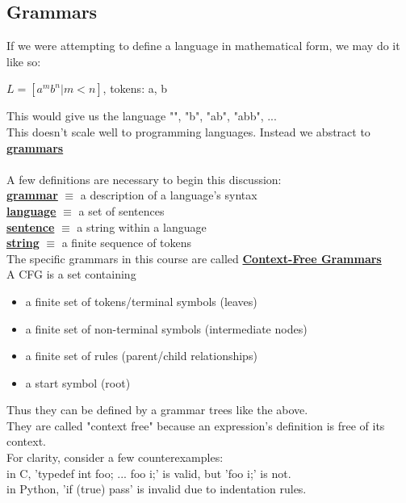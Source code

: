 \documentclass[../../lecture_notes.tex]{subfiles}
\begin{document}
\subsection*{Grammars}
\noindent If we were attempting to define a language in mathematical form, we may do it like so:
	\begin{center} $L = [a^m b^n | m < n]$, tokens: {a, b} \end{center}
This would give us the language {"", "b", "ab", "abb", ...}\\
This doesn't scale well to programming languages.  Instead we abstract to \textbf{\underline{grammars}}\\
\\
A few definitions are necessary to begin this discussion:\\
\indent \textbf{\underline{grammar}} $\equiv$ a description of a language's syntax\\
\indent \indent  \textbf{\underline{language}} $\equiv$ a set of sentences\\
\indent \indent  \textbf{\underline{sentence}} $\equiv$ a string within a language\\
\indent \indent  \textbf{\underline{string}} $\equiv$ a finite sequence of tokens\\
The specific grammars in this course are called \textbf{\underline{Context-Free Grammars}}\\
A CFG is a set containing \begin{itemize} [itemsep=0mm]
	\item a finite set of tokens/terminal symbols (leaves)
	\item a finite set of non-terminal symbols (intermediate nodes)
	\item a finite set of rules (parent/child relationships)
	\item a start symbol (root)
\end{itemize}
Thus they can be defined by a grammar trees like the above.\\
They are called "context free" because an expression's definition is free of its context.\\
For clarity, consider a few counterexamples:\\
\indent in C, 'typedef int foo; ... foo i;' is valid, but 'foo i;' is not.\\
\indent in Python, 'if (true) pass' is invalid due to indentation rules.
\end{document}
